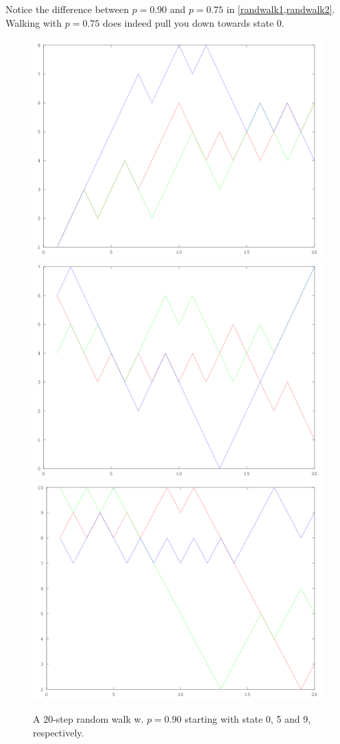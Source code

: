 Notice the difference between $p=0.90$ and $p=0.75$ in \cref{randwalk1,randwalk2}. Walking with $p=0.75$ does indeed pull you down towards state 0.
\begin{figure}[!htbp]
  \includegraphics[width=\textwidth/2]{randwalk0.png}
  \includegraphics[width=\textwidth/2]{randwalk5.png}
  \includegraphics[width=\textwidth/1]{randwalk9.png}
  \caption{A 20-step random walk w. $p=0.90$ starting with state 0, 5 and 9, respectively.}
  \label{randwalk1}
\end{figure}


